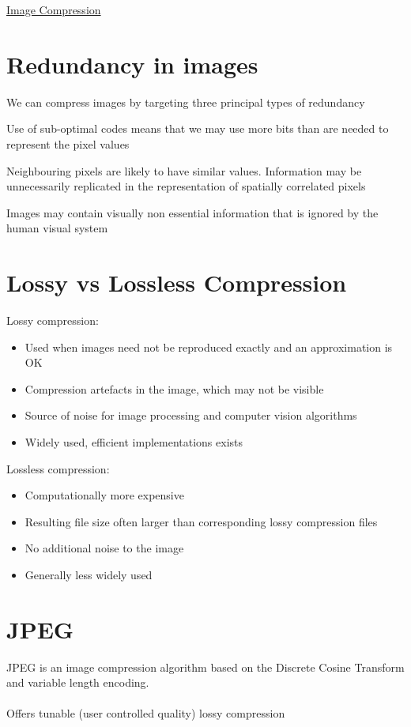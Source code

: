 \documentclass{article}[18pt]
\begin{document}
\begin{center}
\underline{\huge Image Compression}
\end{center}
\section{Redundancy in images}
We can compress images by targeting three principal types of redundancy
\begin{definition}
Use of sub-optimal codes means that we may use more bits than are needed to represent the pixel values
\end{definition}
\begin{definition}
Neighbouring pixels are likely to have similar values. Information may be unnecessarily replicated in the representation of spatially correlated pixels 
\end{definition}
\begin{definition}
Images may contain visually non essential information that is ignored by the human visual system
\end{definition}
\section{Lossy vs Lossless Compression}
Lossy compression:
\begin{itemize}
	\item Used when images need not be reproduced exactly and an approximation is OK
	\item Compression artefacts in the image, which may not be visible
	\item Source of noise for image processing and computer vision algorithms
	\item Widely used, efficient implementations exists
\end{itemize}
Lossless compression:
\begin{itemize}
	\item Computationally more expensive
	\item Resulting file size often larger than corresponding lossy compression files
	\item No additional noise to the image
	\item Generally less widely used
\end{itemize}
\section{JPEG}
JPEG is an image compression algorithm based on the Discrete Cosine Transform and variable length encoding.\\
\\
Offers tunable (user controlled quality) lossy compression
\end{document}
